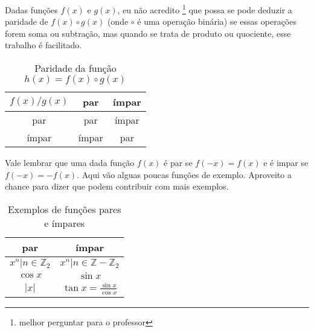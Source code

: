 \documentclass[12pt,openany, letterpaper]{book}
\begin{document}
{{\hspace{5mm}Dadas funções $f(x)$ e $g(x)$, eu não acredito  \footnote{melhor perguntar para o professor} que possa se pode deduzir a paridade de $f(x) \circ g(x)$ (onde $\circ$ é uma operação binária) se essas operações forem soma ou subtração, mas quando se trata de produto ou quociente, esse trabalho é facilitado.

\begin{table}[ht]
\centering
\begin{tabular}{|c|c|c|}
\hline
$f(x) / g(x)$ & par & ímpar \\ \hline 
 par &  par & ímpar \\
 ímpar & ímpar & par \\ \hline
\end{tabular}
\caption{Paridade da função $h(x) = f(x) \circ g(x)$}
\label{tab:par1}
\end{table}

Vale lembrar que uma dada função $f(x)$ é par se $f(-x) = f(x)$ e é impar se $f(-x) = - f(x)$. Aqui vão alguas poucas funções de exemplo. Aproveito a chance para dizer que podem contribuir com mais exemplos. 

\begin{table}[ht]
\centering
\begin{tabular}{|c|c|}
\hline
par & ímpar \\ \hline 
 $x^n | n \in \mathds{Z}_2$ &  $x^n | n \in \mathds{Z} - \mathds{Z}_2$ \\
 $\cos x$ & $\sin{x}$\\ 
 $|x|$ & $ \tan x = \frac{\sin x}{\cos x}$ \\ \hline
\end{tabular}
\caption{Exemplos de funções pares e ímpares}
\label{tab:par2}
\end{table}

}}
\end{document}
